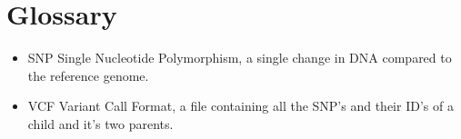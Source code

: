 \section{Glossary}
	\begin{itemize}
		\item SNP
			\subitem Single Nucleotide Polymorphism, a single change in DNA compared to the reference genome.
		\item VCF
			\subitem Variant Call Format, a file containing all the SNP's and their ID's of a child and it's two parents.
	\end{itemize}